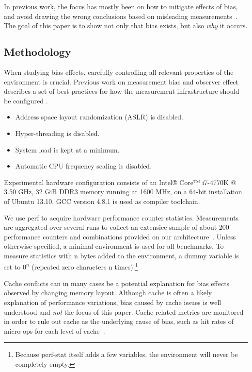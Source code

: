 \documentclass[a4paper,10pt,twocolumn,twoside]{article}
\begin{document}
In previous work, the focus has mostly been on how to mitigate effects of bias, and avoid drawing the wrong conclusions based on misleading measurements~\cite{Mytkowicz:2008:Easy, Mytkowicz:2009:WrongData}.
The goal of this paper is to show not only that bias exists, but also \emph{why} it occurs. 


\subsection{Methodology}
When studying bias effects, carefully controlling all relevant properties of the environment is crucial. 
Previous work on measurement bias and observer effect describes a set of best practices for how the measurement infrastructure should be configured \cite{Mytkowicz:2009:WrongData, Mytkowicz:2008:OE&MB}. 
\begin{itemize}
  \item Address space layout randomization (ASLR) is disabled.
  \item Hyper-threading is disabled.
  \item System load is kept at a minimum.
  \item Automatic CPU frequency scaling is disabled.
\end{itemize}
Experimental hardware configuration consists of an Intel® Core™ i7-4770K @ 3.50 GHz, 32 GiB DDR3 memory running at 1600 MHz, on a 64-bit installation of Ubuntu 13.10. GCC version 4.8.1 is used as compiler toolchain.

We use perf to acquire hardware performance counter statistics.
Measurements are aggregated over several runs to collect an extensice sample of about 200 performance counters and combinations provided on our architecture~\cite{Intel:2013:Volume3B}. 
Unless otherwise specified, a minimal environment is used for all benchmarks. 
To measure statistics with n bytes added to the environment, a dummy variable is set to \(0^{n}\) (repeated zero characters n times).\footnote{Because perf-stat itself adds a few variables, the environment will never be completely empty.}

Cache conflicts can in many cases be a potential explanation for bias effects observed by changing memory layout.
Although cache is often a likely explanation of performance variations, bias caused by cache issues is well understood and \emph{not} the focus of this paper.
Cache related metrics are monitored in order to rule out cache as the underlying cause of bias, such as hit rates of micro-ops for each level of cache~\cite{Intel:2012:OptimizationManual}.
\fi
\end{document}
